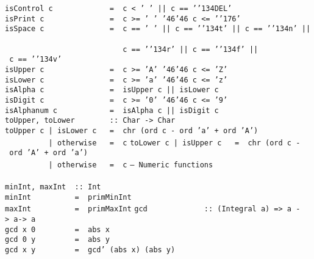 \mbox{\tt isControl\ c\ \ \ \ \ \ \ \ \ \ \ \ \ =\ \ c\ <\ '\ '\ ||\ c\ ==\ '{\char'134}DEL'}\\
\mbox{\tt isPrint\ c\ \ \ \ \ \ \ \ \ \ \ \ \ \ \ =\ \ c\ >=\ '\ '\ {\char'46}{\char'46}\ c\ <=\ '{\char'176}'}\\
\mbox{\tt isSpace\ c\ \ \ \ \ \ \ \ \ \ \ \ \ \ \ =\ \ c\ ==\ '\ '\ ||\ c\ ==\ '{\char'134}t'\ ||\ c\ ==\ '{\char'134}n'\ ||\ }\\
\mbox{\tt \ \ \ \ \ \ \ \ \ \ \ \ \ \ \ \ \ \ \ \ \ \ \ \ \ \ \ c\ ==\ '{\char'134}r'\ ||\ c\ ==\ '{\char'134}f'\ ||\ c\ ==\ '{\char'134}v'}\\
\mbox{\tt isUpper\ c\ \ \ \ \ \ \ \ \ \ \ \ \ \ \ =\ \ c\ >=\ 'A'\ {\char'46}{\char'46}\ c\ <=\ 'Z'}\\
\mbox{\tt isLower\ c\ \ \ \ \ \ \ \ \ \ \ \ \ \ \ =\ \ c\ >=\ 'a'\ {\char'46}{\char'46}\ c\ <=\ 'z'}\\
\mbox{\tt isAlpha\ c\ \ \ \ \ \ \ \ \ \ \ \ \ \ \ =\ \ isUpper\ c\ ||\ isLower\ c}\\
\mbox{\tt isDigit\ c\ \ \ \ \ \ \ \ \ \ \ \ \ \ \ =\ \ c\ >=\ '0'\ {\char'46}{\char'46}\ c\ <=\ '9'}\\
\mbox{\tt isAlphanum\ c\ \ \ \ \ \ \ \ \ \ \ \ =\ \ isAlpha\ c\ ||\ isDigit\ c}
\eprogB\noindent\bprogB
\mbox{\tt toUpper,\ toLower\ \ \ \ \ \ \ \ ::\ Char\ ->\ Char}\\
\mbox{\tt toUpper\ c\ |\ isLower\ c\ \ \ =\ \ chr\ (ord\ c\ -\ ord\ 'a'\ +\ ord\ 'A')}\\
\mbox{\tt \ \ \ \ \ \ \ \ \ \ |\ otherwise\ \ \ =\ \ c}
%
%
\eprogB\noindent\bprogB
\mbox{\tt toLower\ c\ |\ isUpper\ c\ \ \ =\ \ chr\ (ord\ c\ -\ ord\ 'A'\ +\ ord\ 'a')}\\
\mbox{\tt \ \ \ \ \ \ \ \ \ \ |\ otherwise\ \ \ =\ \ c}
\eprogB\noindent\bprogB
\mbox{\tt --\ Numeric\ functions}\\
\mbox{\tt }\\
\mbox{\tt minInt,\ maxInt\ \ ::\ Int}\\
\mbox{\tt minInt\ \ \ \ \ \ \ \ \ \ =\ \ primMinInt}\\
\mbox{\tt maxInt\ \ \ \ \ \ \ \ \ \ =\ \ primMaxInt}
%
%
\eprogB\noindent\bprogB
\mbox{\tt gcd\ \ \ \ \ \ \ \ \ \ \ \ \ ::\ (Integral\ a)\ =>\ a\ ->\ a->\ a}\\
\mbox{\tt gcd\ x\ 0\ \ \ \ \ \ \ \ \ =\ \ abs\ x}\\
\mbox{\tt gcd\ 0\ y\ \ \ \ \ \ \ \ \ =\ \ abs\ y}\\
\mbox{\tt gcd\ x\ y\ \ \ \ \ \ \ \ \ =\ \ gcd'\ (abs\ x)\ (abs\ y)}\\
